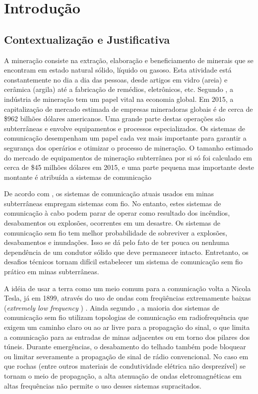 \chapter[Introdução]{Introdução}

\section{Contextualização e Justificativa}


A mineração consiste na extração, elaboração e beneficiamento de minerais que se encontram em
estado natural sólido, líquido ou gasoso.  Esta atividade está constantemente no dia a dia das pessoas, desde artigos em vidro (areia) e cerâmica (argila) até a fabricação de remédios, eletrônicos, etc. Segundo , a indústria de mineração tem um papel vital na economia global. Em 2015, a capitalização de mercado estimada de empresas mineradoras globais é de cerca de \$962 bilhões dólares americanos. Uma grande parte destas operações são subterrâneas e envolve equipamentos e processos especializados. Os sistemas de comunicação desempenham um papel cada vez mais importante para garantir a segurança dos operários e otimizar o processo de mineração. O tamanho estimado do mercado de equipamentos de mineração subterrânea por si só foi calculado em cerca de \$45 milhões dólares em 2015, e uma parte pequena mas importante deste montante é atribuída a sistemas de comunicação

De acordo com , os sistemas de comunicação atuais usados em minas subterrâneas empregam sistemas com fio. No entanto, estes sistemas de comunicação à cabo podem parar de operar como resultado dos incêndios, desabamentos ou explosões, ocorrentes em um desastre. Os sistemas de comunicação sem fio tem melhor probabilidade de sobreviver a explosões, desabamentos e inundações. Isso se dá pelo fato de ter pouca ou nenhuma dependência de um condutor sólido que deve permanecer intacto. Entretanto, os desafios técnicos tornam difícil estabelecer um sistema de comunicação sem fio prático em minas subterrâneas. 

A idéia de usar a terra como um meio comum para a comunicação volta a Nicola Tesla, já em 1899, através do uso de ondas com freqüências extremamente baixas (\textit{extremely low frequency })  \cite{wheeler1961radio}. Ainda segundo , a maioria dos sistemas de comunicação sem fio utilizam topologias de comunicação em radiofrequência que exigem um caminho claro ou ao ar livre para a propagação do sinal, o que limita a comunicação para as entradas de minas adjacentes ou em torno dos pilares dos túneis. Durante emergências, o desabamento do telhado também pode bloquear ou limitar severamente a propagação de sinal de rádio convencional. No caso em que rochas (entre outros materiais de condutividade elétrica não desprezível) se tornam o meio de propagação, a alta atenuação de ondas eletromagnéticas em altas frequências não permite o uso desses sistemas supracitados. \cite{raab1995signal}

